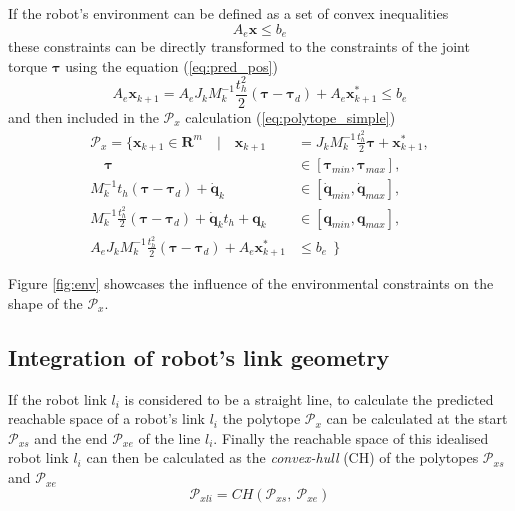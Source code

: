 If the robot's environment can be defined as a set of convex inequalities
\begin{equation}
    A_e \bm{x} \leq b_e
\end{equation}
these constraints can be directly transformed to the constraints of the joint torque $\bm{\tau}$ using the equation (\ref{eq:pred_pos})
\begin{equation}
    A_e\bm{x}_{k+1} = A_e J_k M_k^{-1}\frac{t_h^2}{2} (\bm{\tau} -\bm{\tau}_d) + A_e \bm{x}^*_{k+1} \leq b_e
    \label{eq:env_limits}
\end{equation}
and then included in the $\mathcal{P}_x$ calculation (\ref{eq:polytope_simple})
\begin{equation}
\begin{split}
    \mathcal{P}_x = \{ \bm{x}_{k+1} \in \mathbf{R}^m \quad| \quad \bm{x}_{k+1} &= J_k M_k^{-1}\frac{t_h^2}{2}\bm{\tau} + \bm{x}^*_{k+1},\\
   \quad \bm{\tau} &\in \left[\bm{\tau}_{min},\bm{\tau}_{max}\right],\\
    M_k^{-1}t_h (\bm{\tau} -\bm{\tau}_d)+ \dot{\bm{q}}_{k} &\in \left[\dot{\bm{q}}_{min},\dot{\bm{q}}_{max}\right],\\
   M_k^{-1}\frac{t_h^2}{2}(\bm{\tau} -\bm{\tau}_d) +  \dot{\bm{q}}_{k}t_h + \bm{q}_{k} &\in \left[\bm{q}_{min},\bm{q}_{max}\right],\\
   A_e J_k M_k^{-1}\frac{t_h^2}{2} (\bm{\tau} -\bm{\tau}_d) + A_e \bm{x}^*_{k+1} &\leq b_e ~~\}
\end{split} 
\label{eq:env}
\end{equation}

Figure \ref{fig:env} showcases the influence of the environmental constraints on the shape of the $\mathcal{P}_x$.


\vspace{-0.2cm}
\subsection{Integration of robot's link geometry}

If the robot link $l_i$ is considered to be a straight line, to calculate the predicted reachable space of a robot's link $l_i$ the polytope $\mathcal{P}_x$ can be calculated at the start $\mathcal{P}_{xs}$ and the end $\mathcal{P}_{xe}$ of the line $l_i$.  Finally the reachable space of this idealised robot link $l_i$ can then be calculated as the \textit{convex-hull} (CH) of the polytopes $\mathcal{P}_{xs}$ and $\mathcal{P}_{xe}$
\begin{equation}
    \mathcal{P}_{xli} = CH \left(  \mathcal{P}_{xs}, ~ \mathcal{P}_{xe} \right)
\end{equation}

